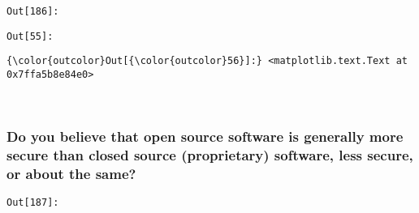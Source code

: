 \documentclass[11pt]{article}
\begin{document}
\texttt{\color{outcolor}Out[{\color{outcolor}186}]:}
    

    

\texttt{\color{outcolor}Out[{\color{outcolor}55}]:}
    

    


            \begin{Verbatim}[commandchars=\\\{\}]
{\color{outcolor}Out[{\color{outcolor}56}]:} <matplotlib.text.Text at 0x7ffa5b8e84e0>
\end{Verbatim}
        
    \begin{center}
    \end{center}
    { \hspace*{\fill} \\}
    
    \subsubsection{Do you believe that open source software is generally
more secure than closed source (proprietary) software, less secure, or
about the
same?}\label{do-you-believe-that-open-source-software-is-generally-more-secure-than-closed-source-proprietary-software-less-secure-or-about-the-same}

\texttt{\color{outcolor}Out[{\color{outcolor}187}]:}
    
\end{document}
